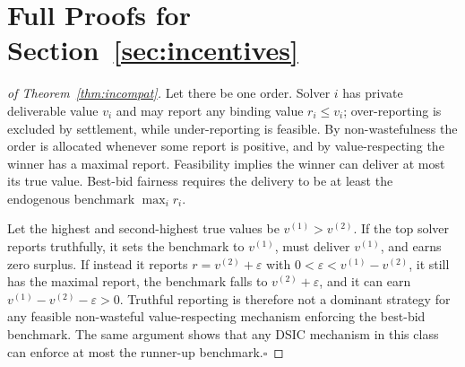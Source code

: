 \section{Full Proofs for Section~\ref{sec:incentives}}

\begin{proof}[of Theorem~\ref{thm:incompat}]
Let there be one order. Solver $i$ has private deliverable value $v_i$
and may report any binding value $r_i\le v_i$; over-reporting is excluded
by settlement, while under-reporting is feasible. By non-wastefulness the
order is allocated whenever some report is positive, and by
value-respecting the winner has a maximal report. Feasibility implies the
winner can deliver at most its true value. Best-bid fairness requires the
delivery to be at least the endogenous benchmark $\max_i r_i$.

Let the highest and second-highest true values be
$v^{(1)}>v^{(2)}$. If the top solver reports truthfully, it sets the
benchmark to $v^{(1)}$, must deliver $v^{(1)}$, and earns zero surplus.
If instead it reports $r=v^{(2)}+\varepsilon$ with
$0<\varepsilon<v^{(1)}-v^{(2)}$, it still has the maximal report, the
benchmark falls to $v^{(2)}+\varepsilon$, and it can earn
$v^{(1)}-v^{(2)}-\varepsilon>0$. Truthful reporting is therefore not a
dominant strategy for any feasible non-wasteful value-respecting
mechanism enforcing the best-bid benchmark. The same argument shows that
any DSIC mechanism in this class can enforce at most the runner-up
benchmark.\hfill$\square$
\end{proof}

